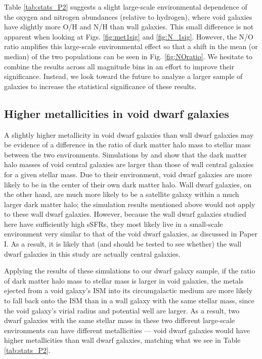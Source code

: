 Table \ref{tab:stats_P2} suggests a slight large-scale environmental dependence 
of the oxygen and nitrogen abundances (relative to hydrogen), where void 
galaxies have slightly more O/H and N/H than wall galaxies.  This small 
difference is not apparent when looking at Figs. \ref{fig:met1sig} and 
\ref{fig:N_1sig}.  However, the N/O ratio amplifies this large-scale 
environmental effect so that a shift in the mean (or median) of the two 
populations can be seen in Fig. \ref{fig:NOratio}.  We hesitate to combine the 
results across all magnitude bins in an effort to improve their significance.  
Instead, we look toward the future to analyze a larger sample of galaxies to 
increase the statistical significance of these results.

\subsection{Higher metallicities in void dwarf galaxies}

A slightly higher metallicity in void dwarf galaxies than wall dwarf galaxies 
may be evidence of a difference in the ratio of dark matter halo mass to stellar 
mass between the two environments.  Simulations by \cite{Jung14} and 
\cite{Tonnesen15} show that the dark matter halo masses of void central galaxies 
are larger than those of wall central galaxies for a given stellar mass.  Due to 
their environment, void dwarf galaxies are more likely to be in the center of 
their own dark matter halo.  Wall dwarf galaxies, on the other hand, are much 
more likely to be a satellite galaxy within a much larger dark matter halo; the 
simulation results mentioned above would not apply to these wall dwarf galaxies.  
However, because the wall dwarf galaxies studied here have sufficiently high 
sSFRs, they most likely live in a small-scale environment very similar to that 
of the void dwarf galaxies, as discussed in Paper I.  As a result, it is likely 
that (and should be tested to see whether) the wall dwarf galaxies in this study 
are actually central galaxies.  

Applying the results of these simulations to our dwarf galaxy sample, if the 
ratio of dark matter halo mass to stellar mass is larger in void galaxies, the 
metals ejected from a void galaxy's ISM into its circumgalactic medium are more 
likely to fall back onto the ISM than in a wall galaxy with the same stellar 
mass, since the void galaxy's virial radius and potential well are larger.  As a 
result, two dwarf galaxies with the same stellar mass in these two different 
large-scale environments can have different metallicities --- void dwarf 
galaxies would have higher metallicities than wall dwarf galaxies, matching what 
we see in Table \ref{tab:stats_P2}.


